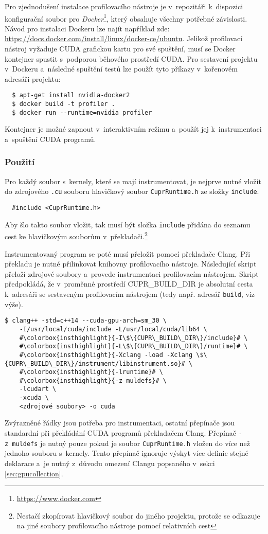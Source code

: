 Pro zjednodušení instalace profilovacího nástroje je v~repozitáři k~dispozici konfigurační soubor pro \emph{Docker}\footnote{\url{https://www.docker.com}}, který obsahuje všechny potřebné závislosti. Návod pro instalaci Dockeru lze najít například zde: \url{https://docs.docker.com/install/linux/docker-ce/ubuntu}.
Jelikož profilovací nástroj vyžaduje CUDA grafickou kartu pro své spuštění, musí se Docker kontejner spustit s~podporou běhového prostředí CUDA. Pro sestavení projektu v~Dockeru a~následné spuštění testů lze použít tyto příkazy v~kořenovém adresáři projektu:
\begin{verbatim}
  $ apt-get install nvidia-docker2
  $ docker build -t profiler .
  $ docker run --runtime=nvidia profiler
\end{verbatim}

Kontejner je možné zapnout v~interaktivním režimu a~použít jej k~instrumentaci a~spuštění CUDA programů.

\subsubsection{Použití}
\label{manual:usage}
Pro každý soubor s~kernely, které se mají instrumentovat, je nejprve nutné vložit do zdrojového \texttt{.cu} souboru hlavičkový soubor \texttt{CuprRuntime.h} ze složky \texttt{include}.
\begin{verbatim}
  #include <CuprRuntime.h>
\end{verbatim}
Aby šlo takto soubor vložit, tak musí být složka \texttt{include} přidána do seznamu cest ke hlavičkovým souborům v~překladači.\footnote{Nestačí zkopírovat hlavičkový soubor do jiného projektu, protože se odkazuje na jiné soubory profilovacího nástroje pomocí relativních cest}

Instrumentovaný program se poté musí přeložit pomocí překladače Clang. Při překladu je nutné přilinkovat knihovny profilovacího nástroje. Následující skript přeloží zdrojové soubory a~provede instrumentaci profilovacím nástrojem. Skript předpokládá, že v~proměnné prostředí CUPR\_BUILD\_DIR je absolutní cesta k~adresáři se sestaveným profilovacím nástrojem (tedy např. adresář \texttt{build}, viz výše).

\begin{verbatim}
$ clang++ -std=c++14 --cuda-gpu-arch=sm_30 \
    -I/usr/local/cuda/include -L/usr/local/cuda/lib64 \
    #\colorbox{insthighlight}{-I\$\{CUPR\_BUILD\_DIR\}/include}# \
    #\colorbox{insthighlight}{-L\$\{CUPR\_BUILD\_DIR\}/runtime}# \
    #\colorbox{insthighlight}{-Xclang -load -Xclang \$\{CUPR\_BUILD\_DIR\}/instrument/libinstrument.so}# \
    #\colorbox{insthighlight}{-lruntime}# \
    #\colorbox{insthighlight}{-z muldefs}# \
    -lcudart \
    -xcuda \
    <zdrojové soubory> -o cuda
\end{verbatim}
Zvýrazněné řádky jsou potřeba pro instrumentaci, ostatní přepínače jsou standardní při překládání CUDA programů překladačem Clang. Přepínač \texttt{-z\ muldefs} je nutný pouze pokud je soubor \texttt{CuprRuntime.h} vložen do více než jednoho souboru s~kernely. Tento přepínač ignoruje výskyt více definic stejné deklarace a~je nutný z~důvodu omezení Clangu popsaného v~sekci \ref{sec:gpucollection}.

